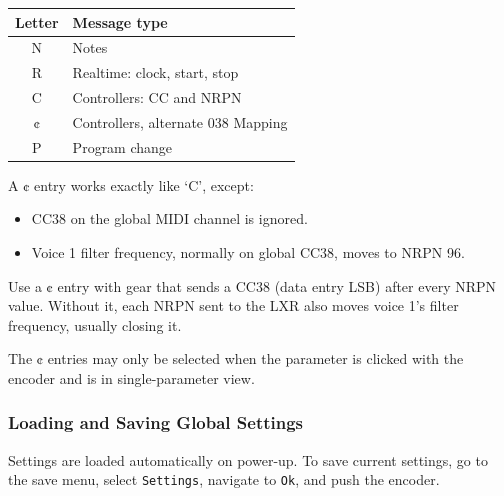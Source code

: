 {\def\LTcaptype{none} %
\begin{longtable}[]{@{}cl@{}}
\toprule\noalign{}
Letter & Message type \\
\midrule\noalign{}
\endhead
\bottomrule\noalign{}
\endlastfoot
N & Notes \\
R & Realtime: clock, start, stop \\
C & Controllers: CC and NRPN \\
¢ & Controllers, alternate 038 Mapping \\
P & Program change \\
\end{longtable}
}

A ¢ entry works exactly like `C', except:

\begin{itemize}
\tightlist
\item
  CC38 on the global MIDI channel is ignored.
\item
  Voice 1 filter frequency, normally on global CC38, moves to NRPN 96.
\end{itemize}

Use a ¢ entry with gear that sends a CC38 (data entry LSB) after every
NRPN value. Without it, each NRPN sent to the LXR also moves voice 1's
filter frequency, usually closing it.

The ¢ entries may only be selected when the parameter is clicked with
the encoder and is in single-parameter view.

\subsubsection{Loading and Saving Global
Settings}\label{loading-and-saving-global-settings}

Settings are loaded automatically on power-up. To save current settings,
go to the save menu, select \texttt{Settings}, navigate to \texttt{Ok},
and push the encoder.
